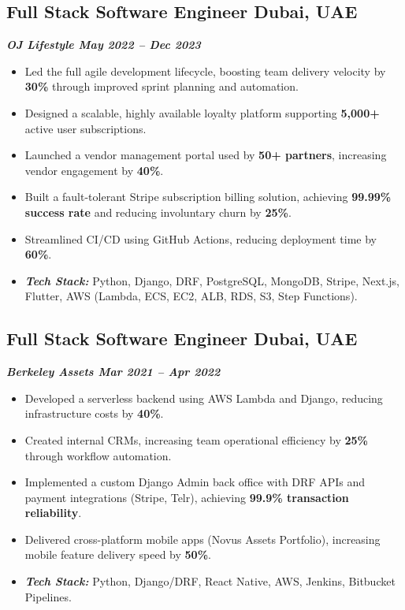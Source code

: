 \documentclass[a4paper,11pt]{article}
\begin{document}
\subsection*{Full Stack Software Engineer \hfill Dubai, UAE}
\vspace{-0.6em}
\textbf{\textit{OJ Lifestyle \hfill May 2022 -- Dec 2023}}
\vspace{-0.6em}
\begin{itemize}
    \item Led the full agile development lifecycle, boosting team delivery velocity by \textbf{30\%} through improved sprint planning and automation.
    \item Designed a scalable, highly available loyalty platform supporting \textbf{5,000+} active user subscriptions.
    \item Launched a vendor management portal used by \textbf{50+ partners}, increasing vendor engagement by \textbf{40\%}.
    \item Built a fault-tolerant Stripe subscription billing solution, achieving \textbf{99.99\% success rate} and reducing involuntary churn by \textbf{25\%}.
    \item Streamlined CI/CD using GitHub Actions, reducing deployment time by \textbf{60\%}.
    \item \textit{\textbf{Tech Stack:}} Python, Django, DRF, PostgreSQL, MongoDB, Stripe, Next.js, Flutter, AWS (Lambda, ECS, EC2, ALB, RDS, S3, Step Functions).
\end{itemize}

\subsection*{Full Stack Software Engineer \hfill Dubai, UAE}
\vspace{-0.6em}
\textbf{\textit{Berkeley Assets \hfill Mar 2021 -- Apr 2022}}
\vspace{-0.6em}
\begin{itemize}
    \item Developed a serverless backend using AWS Lambda and Django, reducing infrastructure costs by \textbf{40\%}.
    \item Created internal CRMs, increasing team operational efficiency by \textbf{25\%} through workflow automation.
    \item Implemented a custom Django Admin back office with DRF APIs and payment integrations (Stripe, Telr), achieving \textbf{99.9\% transaction reliability}.
    \item Delivered cross-platform mobile apps (Novus Assets Portfolio), increasing mobile feature delivery speed by \textbf{50\%}.
    \item \textit{\textbf{Tech Stack:}} Python, Django/DRF, React Native, AWS, Jenkins, Bitbucket Pipelines.
\end{itemize}
\end{document}
